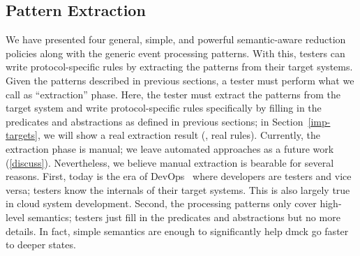 \subsection{Pattern Extraction}
\label{sam-extract}


We have presented four general, simple, and powerful semantic-aware
reduction policies along with the generic event processing patterns.
With this, testers can write protocol-specific rules by extracting the
patterns from their target systems.  
%
Given the patterns described in previous sections, a tester must
perform what we call as ``extraction'' phase.  Here, the tester must
extract the patterns from the target system and write
protocol-specific rules specifically by filling in the predicates and
abstractions as defined in previous sections; in
Section~\ref{imp-targets}, we will show a real extraction result (\ie,
real rules).  Currently, the extraction phase is manual; we leave
automated approaches as a future work (\sec\ref{discuss}).
Nevertheless, we believe manual extraction is bearable for several
reasons.  First, today is the era of
DevOps~\cite{Limoncelli+11-Devops} where developers are testers and
vice versa; testers know the internals of their target systems.  This
is also largely true in cloud system development.  Second, the
processing patterns only cover high-level semantics; testers just fill
in the predicates and abstractions but no more details.  In fact,
simple semantics are enough to significantly help dmck go faster to
deeper states.




